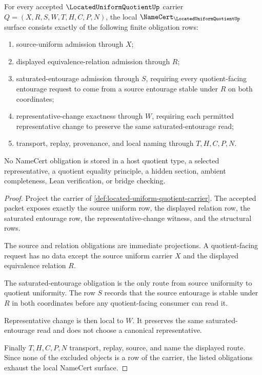 \begin{theorem}
\label{thm:located-uniform-quotient-namecert-obligations}
For every accepted $\LocatedUniformQuotientUp$ carrier $Q=(X,R,S,W,T,H,C,P,N)$, the local $\NameCert_{\LocatedUniformQuotientUp}$ surface consists exactly of the following finite obligation rows:
\begin{enumerate}
\item source-uniform admission through $X$;
\item displayed equivalence-relation admission through $R$;
\item saturated-entourage admission through $S$, requiring every quotient-facing entourage request to come from a source entourage stable under $R$ on both coordinates;
\item representative-change exactness through $W$, requiring each permitted representative change to preserve the same saturated-entourage read;
\item transport, replay, provenance, and local naming through $T,H,C,P,N$.
\end{enumerate}
No NameCert obligation is stored in a host quotient type, a selected representative, a quotient equality principle, a hidden section, ambient completeness, Lean verification, or bridge checking.
\end{theorem}
\begin{proof}
Project the carrier of \autoref{def:located-uniform-quotient-carrier}. The accepted packet exposes exactly the source uniform row, the displayed relation row, the saturated entourage row, the representative-change witness, and the structural rows.

The source and relation obligations are immediate projections. A quotient-facing request has no data except the source uniform carrier $X$ and the displayed equivalence relation $R$.

The saturated-entourage obligation is the only route from source uniformity to quotient uniformity. The row $S$ records that the source entourage is stable under $R$ in both coordinates before any quotient-facing consumer can read it.

Representative change is then local to $W$. It preserves the same saturated-entourage read and does not choose a canonical representative.

Finally $T,H,C,P,N$ transport, replay, source, and name the displayed route. Since none of the excluded objects is a row of the carrier, the listed obligations exhaust the local NameCert surface.
\end{proof}

